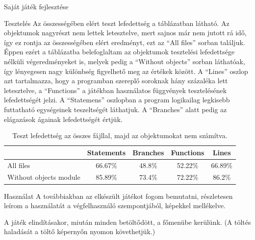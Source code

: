 \begin{MyChapter}{Saját játék fejlesztése}
\begin{MySection}{Tesztelés}
		Az összességében elért teszt lefedettség a  táblázatban látható. Az objektumok nagyrészt nem lettek letesztelve, mert sajnos már nem jutott rá idő, így ez rontja az összességében elért eredményt, ezt az ``All files'' sorban találjuk. Éppen ezért a táblázatba belefoglaltam az objektumok tesztelési lefedettsége nélküli végeredményeket is, melyek pedig a ``Without objects'' sorban láthatóak, így lényegesen nagy különbség figyelhető meg az értékek között.
		A ``Lines'' oszlop azt tartalmazza, hogy a programban szereplő soroknak hány százaléka lett letesztelve, a ``Functions'' a játékban használatos függvények tesztelésének lefedettségét jelzi.
		A ``Statemens'' oszlopban a program logikailag legkisebb futtatható egységeinek teszeltségét láthatjuk.
		A ``Branches'' alatt pedig az elágazások ágainak lefedettségét értjük.

			
		\begin{table}[h]
			\centering
			\caption{Teszt lefedettség az összes fájllal, majd az objektumokat nem számítva.}
			\label{tab:teszt_lefedettseg}
			\begin{tabular}{l|c|c|c|c|}
				\cline{2-5}
				& Statements & Branches & Functions & Lines \\ \hline
				\multicolumn{1}{|l|}{All files} & 66.67\% & 48.8\% & 52.22\% & 66.89\% \\ \hline
				\multicolumn{1}{|l|}{Without objects module} & 85.89\% & 73.4\% & 72.22\% & 86.2\% \\ \hline
			\end{tabular}
		\end{table}
		
	\end{MySection}

	\begin{MySection}{Használat}
		A továbbiakban az elkészült játékot fogom bemutatni, részletesen leírom a használatát a végfelhasználó szempontjából, képekkel mellékelve.
		
		A játék elindításakor, miután minden betöltődött, a főmenübe kerülünk. (A töltés haladását a töltő képernyőn nyomon követhetjük.)


\end{MySection}
\end{MyChapter}
